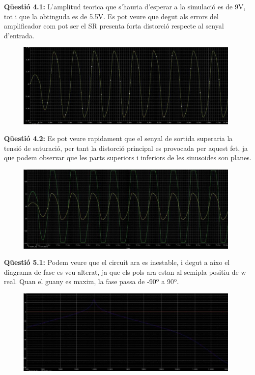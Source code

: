 \documentclass[12pt, a4papre]{article}
\begin{document}
	\textbf{Qüestió 4.1:} L'amplitud teorica que s'hauria d'esperar a la simulació es de 9V, tot i que la obtinguda es de 5.5V. Es pot veure que degut als errors del amplificador com pot ser el SR presenta forta distorció respecte al senyal d'entrada.
	
	\begin{figure}[H]
		\begin{center}
		\includegraphics[width=110mm]{4_1.png}
		\end{center}
	\end{figure}
	
	\textbf{Qüestió 4.2:} Es pot veure rapidament que el senyal de sortida superaria la tensió de saturació, per tant la distorció principal es provocada per aquest fet, ja que podem observar que les parts superiors i inferiors de les sinusoides son planes.
	
	\begin{figure}[H]
		\begin{center}
		\includegraphics[width=110mm]{4_2.png}
		\end{center}
	\end{figure}
	
	\textbf{Qüestió 5.1:} Podem veure que el circuit ara es inestable, i degut a aixo el diagrama de fase es veu alterat, ja que els pols ara estan al semipla positiu de w real. Quan el guany es maxim, la fase passa de -90º a 90º.
	
	\begin{figure}[H]
		\begin{center}
		\includegraphics[width=110mm]{5_1.png}
		\end{center}
	\end{figure}
	
\end{document}
